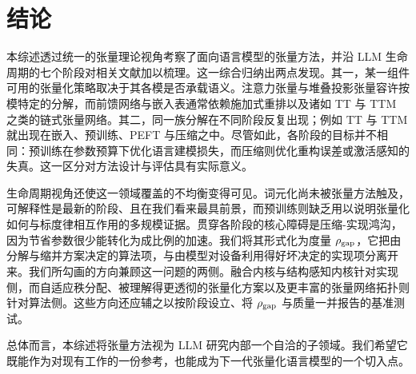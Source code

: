 \section{结论}
\label{sec:conclusion}
本综述透过统一的张量理论视角考察了面向语言模型的张量方法，并沿 LLM 生命周期的七个阶段对相关文献加以梳理。这一综合归纳出两点发现。其一，某一组件可用的张量化策略取决于其各模是否承载语义。注意力张量与堆叠投影张量容许按模特定的分解，而前馈网络与嵌入表通常依赖施加式重排以及诸如 TT 与 TTM 之类的链式张量网络。其二，同一族分解在不同阶段反复出现；例如 TT 与 TTM 就出现在嵌入、预训练、PEFT 与压缩之中。尽管如此，各阶段的目标并不相同：预训练在参数预算下优化语言建模损失，而压缩则优化重构误差或激活感知的失真。这一区分对方法设计与评估具有实际意义。

生命周期视角还使这一领域覆盖的不均衡变得可见。词元化尚未被张量方法触及，可解释性是最新的阶段、且在我们看来最具前景，而预训练则缺乏用以说明张量化如何与标度律相互作用的多规模证据。贯穿各阶段的核心障碍是压缩-实现鸿沟，因为节省参数很少能转化为成比例的加速。我们将其形式化为度量 $\rho_{\rm gap}$，它把由分解与缩并方案决定的算法项，与由模型对设备利用得好坏决定的实现项分离开来。我们所勾画的方向兼顾这一问题的两侧。融合内核与结构感知内核针对实现侧，而自适应秩分配、被理解得更透彻的张量化方案以及更丰富的张量网络拓扑则针对算法侧。这些方向还应辅之以按阶段设立、将 $\rho_{\rm gap}$ 与质量一并报告的基准测试。

总体而言，本综述将张量方法视为 LLM 研究内部一个自洽的子领域。我们希望它既能作为对现有工作的一份参考，也能成为下一代张量化语言模型的一个切入点。


